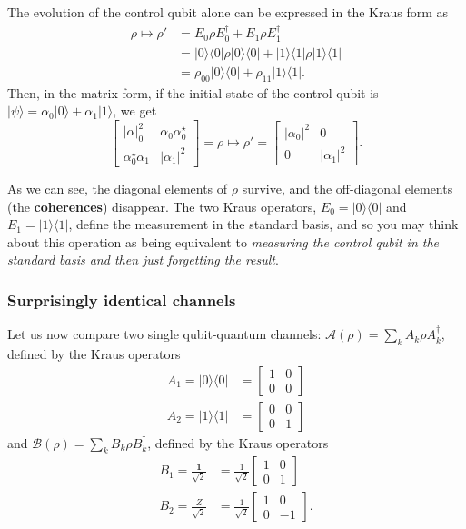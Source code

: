 \documentclass[fleqn,a4paper]{article}
\theoremstyle{definition}
\theoremstyle{definition}
\theoremstyle{definition}
\theoremstyle{definition}
\theoremstyle{remark}
\begin{document}
The evolution of the control qubit alone can be expressed in the Kraus form as
\[
  \begin{aligned}
    \rho \longmapsto \rho'
    &= E_0\rho E_0^\dagger + E_1\rho E_1^\dagger
  \\&= |0\rangle\langle 0|\rho|0\rangle\langle 0| + |1\rangle\langle 1|\rho|1\rangle\langle 1|
  \\&= \rho_{00}|0\rangle\langle 0| + \rho_{11}|1\rangle\langle 1|.
  \end{aligned}
\]
Then, in the matrix form, if the initial state of the control qubit is \(|\psi\rangle=\alpha_0|0\rangle+\alpha_1|1\rangle\), we get
\[
  \begin{bmatrix}
    |\alpha|_0^2 & \alpha_0\alpha_0^\star
  \\\alpha_0^\star\alpha_1 & |\alpha_1|^2
  \end{bmatrix}
  = \rho
  \longmapsto
  \rho' =
  \begin{bmatrix}
    |\alpha_0|^2 & 0
  \\0 & |\alpha_1|^2
  \end{bmatrix}.
\]

As we can see, the diagonal elements of \(\rho\) survive, and the off-diagonal elements (the \textbf{coherences}) disappear.
The two Kraus operators, \(E_0=|0\rangle\langle 0|\) and \(E_1=|1\rangle\langle 1|\), define the measurement in the standard basis, and so you may think about this operation as being equivalent to \emph{measuring the control qubit in the standard basis and then just forgetting the result}.

\hypertarget{surprisingly-identical-channels}{%
\subsubsection{Surprisingly identical channels}\label{surprisingly-identical-channels}}

Let us now compare two single qubit-quantum channels: \(\mathcal{A}(\rho)=\sum_k A_k\rho A^\dagger_k\), defined by the Kraus operators
\[
  \begin{aligned}
    A_1 = |0\rangle\langle 0|
    &= \begin{bmatrix}1&0\\0&0\end{bmatrix}
  \\A_2 = |1\rangle\langle 1|
  &= \begin{bmatrix}0&0\\0&1\end{bmatrix}
  \end{aligned}
\]
and \(\mathcal{B}(\rho)=\sum_k B_k\rho B^\dagger_k\), defined by the Kraus operators
\[
  \begin{aligned}
    B_1 = \frac{\mathbf{1}}{\sqrt{2}}
    &= \frac{1}{\sqrt{2}}\begin{bmatrix}1&0\\0&1\end{bmatrix}
  \\B_2 = \frac{Z}{\sqrt{2}}
    &= \frac{1}{\sqrt{2}}\begin{bmatrix}1&0\\0&-1\end{bmatrix}.
  \end{aligned}
\]
\end{document}
